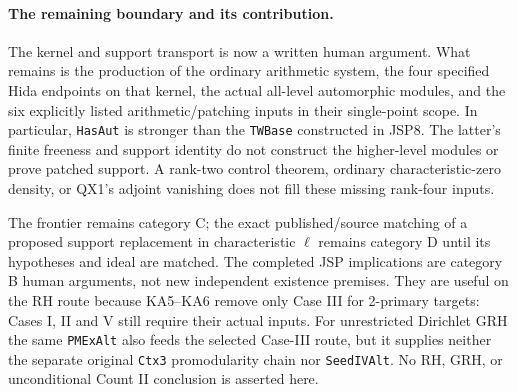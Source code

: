 \paragraph{The remaining boundary and its contribution.}
The kernel and support transport is now a written human argument.
What remains is the production of the ordinary arithmetic system,
the four specified Hida endpoints on that kernel, the actual
all-level automorphic modules, and the six explicitly listed
arithmetic/patching inputs in their single-point scope.
In particular, \texttt{HasAut} is stronger than the
\texttt{TWBase} constructed in JSP8. The latter's finite freeness
and support identity do not construct the higher-level modules or
prove patched support. A rank-two control theorem, ordinary
characteristic-zero density, or QX1's adjoint vanishing does not
fill these missing rank-four inputs.

The frontier remains category C; the exact published/source
matching of a proposed support replacement in characteristic $\ell$
remains category D until its hypotheses and ideal are matched.
The completed JSP implications are category B human arguments,
not new independent existence premises. They are useful on the
RH route because KA5--KA6 remove only Case III for 2-primary
targets: Cases I, II and V still require their actual inputs.
For unrestricted Dirichlet GRH the same \texttt{PMExAlt}
also feeds the selected Case-III route, but it supplies neither
the separate original \texttt{Ctx3} promodularity chain nor
\texttt{SeedIVAlt}. No RH, GRH, or unconditional Count II
conclusion is asserted here.
